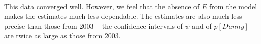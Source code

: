 \documentclass{article}
\begin{document}
    \\

    This data converged well.  However, we feel that the absence of \(E\) from
    the model makes the estimates much less dependable.  The estimates are also
    much less precise than those from 2003 -- the confidence intervals of
    \(\psi\) and of \(p[Danny]\) are twice as large as those from 2003. \\
\end{document}
